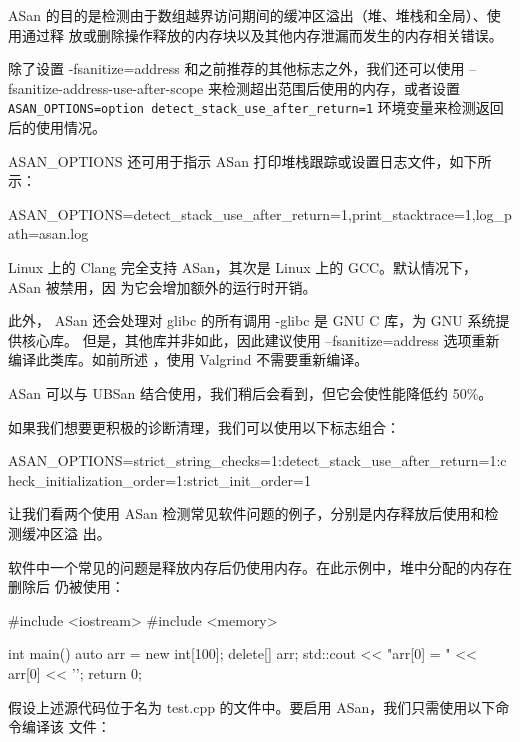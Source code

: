 ASan 的目的是检测由于数组越界访问期间的缓冲区溢出（堆、堆栈和全局）、使用通过释
放或删除操作释放的内存块以及其他内存泄漏而发生的内存相关错误。

除了设置 -fsanitize=address 和之前推荐的其他标志之外，我们还可以使用 –fsanitize-address-use-after-scope 来检测超出范围后使用的内存，或者设置 \verb|ASAN_OPTIONS=option detect_stack_use_after_return=1| 环境变量来检测返回后的使用情况。

ASAN\_OPTIONS 还可用于指示 ASan 打印堆栈跟踪或设置日志文件，如下所示：

\begin{shell}
ASAN_OPTIONS=detect_stack_use_after_return=1,print_stacktrace=1,log_path=asan.log
\end{shell}

Linux 上的 Clang 完全支持 ASan，其次是 Linux 上的 GCC。默认情况下， ASan 被禁用，因
为它会增加额外的运行时开销。

此外， ASan 还会处理对 glibc 的所有调用 -glibc 是 GNU C 库，为 GNU 系统提供核心库。
但是，其他库并非如此，因此建议使用 –fsanitize=address 选项重新编译此类库。如前所述
，使用 Valgrind 不需要重新编译。

ASan 可以与 UBSan 结合使用，我们稍后会看到，但它会使性能降低约 50\%。

如果我们想要更积极的诊断清理，我们可以使用以下标志组合：

\begin{shell}
ASAN_OPTIONS=strict_string_checks=1:detect_stack_use_after_return=1:check_initialization_order=1:strict_init_order=1
\end{shell}

让我们看两个使用 ASan 检测常见软件问题的例子，分别是内存释放后使用和检测缓冲区溢
出。


软件中一个常见的问题是释放内存后仍使用内存。在此示例中，堆中分配的内存在删除后
仍被使用：

\begin{cpp}
#include <iostream>
#include <memory>

int main() {
    auto arr = new int[100];
    delete[] arr;
    std::cout << "arr[0] = " << arr[0] << '\n';
    return 0;
}
\end{cpp}

假设上述源代码位于名为 test.cpp 的文件中。要启用 ASan，我们只需使用以下命令编译该
文件：


